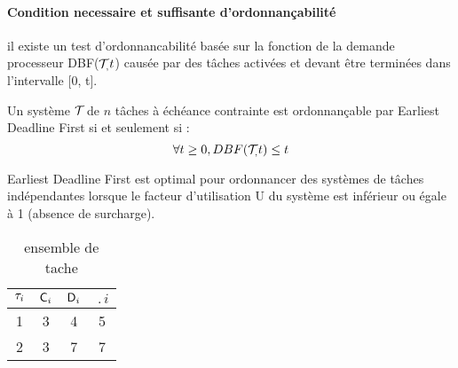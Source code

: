 \paragraph{Condition necessaire et suffisante
  d'ordonnançabilité}\cite{BHR93} il existe un test d’ordonnancabilité
basée sur la fonction de la demande processeur DBF($\mathcal{T}_{,}t$)
causée par des tâches activées et devant être terminées dans
l’intervalle [0, t].

\begin{theoreme}
Un système $\mathcal{T}_{}$ de $n$ tâches à échéance contrainte est
ordonnançable par Earliest Deadline First si et seulement si :
\begin{equation}
\forall t \geq 0 , DBF(\mathcal{T}_{,}t) \leq t 
\end{equation}
\end{theoreme}

\begin{theoreme}
Earliest Deadline First est optimal pour ordonnancer des systèmes de
tâches indépendantes lorsque le facteur d'utilisation U du système est
inférieur ou égale à 1 (absence de surcharge).
\end{theoreme}

\begin{table}[h]
\begin{center}
\begin{tabular}{|c|c|c|c|}
 \hline$\tau_{i}$ & $\mathsf{C}_{i}$ & $\mathsf{D}_{i}$ & $\period{i}$\\ 
 \hline1 & 3 & 4 & 5\\ 
 \hline2 & 3 & 7 & 7 \\  
 \hline
 \end{tabular}
\end{center}
\caption{ensemble de tache } \label{tab:exempleEDF}
\end{table}







